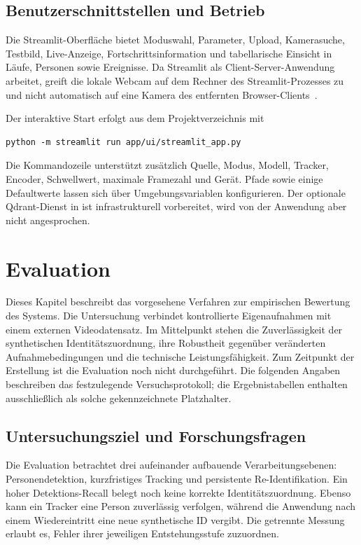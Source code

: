 \documentclass[runningheads]{llncs}
\begin{document}
\subsection{Benutzerschnittstellen und Betrieb}

Die Streamlit-Oberfläche bietet Moduswahl, Parameter, Upload, Kamerasuche, Testbild, Live-Anzeige, Fortschrittsinformation und tabellarische Einsicht in Läufe, Personen sowie Ereignisse. Da Streamlit als Client-Server-Anwendung arbeitet, greift die lokale Webcam auf dem Rechner des Streamlit-Prozesses zu und nicht automatisch auf eine Kamera des entfernten Browser-Clients~\cite{streamlit-architecture}.

Der interaktive Start erfolgt aus dem Projektverzeichnis mit
\begin{verbatim}
python -m streamlit run app/ui/streamlit_app.py
\end{verbatim}
Die Kommandozeile unterstützt zusätzlich Quelle, Modus, Modell, Tracker, Encoder, Schwellwert, maximale Framezahl und Gerät. Pfade sowie einige Defaultwerte lassen sich über Umgebungsvariablen konfigurieren. Der optionale Qdrant-Dienst in  ist infrastrukturell vorbereitet, wird von der Anwendung aber nicht angesprochen.

\section{Evaluation}
\label{sec:evaluation}

Dieses Kapitel beschreibt das vorgesehene Verfahren zur empirischen Bewertung des Systems. Die Untersuchung verbindet kontrollierte Eigenaufnahmen mit einem externen Videodatensatz. Im Mittelpunkt stehen die Zuverlässigkeit der synthetischen Identitätszuordnung, ihre Robustheit gegenüber veränderten Aufnahmebedingungen und die technische Leistungsfähigkeit. Zum Zeitpunkt der Erstellung ist die Evaluation noch nicht durchgeführt. Die folgenden Angaben beschreiben das festzulegende Versuchsprotokoll; die Ergebnistabellen enthalten ausschließlich als solche gekennzeichnete Platzhalter.

\subsection{Untersuchungsziel und Forschungsfragen}

Die Evaluation betrachtet drei aufeinander aufbauende Verarbeitungsebenen: Personendetektion, kurzfristiges Tracking und persistente Re-Identifikation. Ein hoher Detektions-Recall belegt noch keine korrekte Identitätszuordnung. Ebenso kann ein Tracker eine Person zuverlässig verfolgen, während die Anwendung nach einem Wiedereintritt eine neue synthetische ID vergibt. Die getrennte Messung erlaubt es, Fehler ihrer jeweiligen Entstehungsstufe zuzuordnen.
\end{document}
